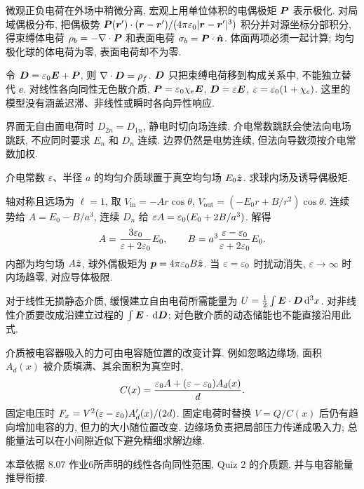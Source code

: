 微观正负电荷在外场中稍微分离, 宏观上用单位体积的电偶极矩 $\boldsymbol{P}$ 表示极化. 对局域偶极分布, 把偶极势 $\boldsymbol{P}(\boldsymbol{r}')\cdot(\boldsymbol{r}-\boldsymbol{r}')/(4\pi\varepsilon_0|\boldsymbol{r}-\boldsymbol{r}'|^3)$ 积分并对源坐标分部积分, 得束缚体电荷 $\rho_b=-\nabla\cdot\boldsymbol{P}$ 和表面电荷 $\sigma_b=\boldsymbol{P}\cdot\hat{\boldsymbol{n}}$. 体面两项必须一起计算; 均匀极化球的体电荷为零, 表面电荷却不为零.

令 $\boldsymbol{D}=\varepsilon_0\boldsymbol{E}+\boldsymbol{P}$, 则 $\nabla\cdot\boldsymbol{D}=\rho_f$. $\boldsymbol{D}$ 只把束缚电荷移到构成关系中, 不能独立替代 $\ee$. 对线性各向同性无色散介质, $\boldsymbol{P}=\varepsilon_0\chi_e\boldsymbol{E}$, $\boldsymbol{D}=\varepsilon\boldsymbol{E}$, $\varepsilon=\varepsilon_0(1+\chi_e)$. 这里的模型没有涵盖迟滞、非线性或瞬时各向异性响应.

界面无自由面电荷时 $D_{2n}=D_{1n}$, 静电时切向场连续. 介电常数跳跃会使法向电场跳跃, 不应同时要求 $E_n$ 和 $D_n$ 连续. 边界仍然是电势连续, 但法向导数须按介电常数加权.

\begin{example}
介电常数 $\varepsilon$、半径 $a$ 的均匀介质球置于真空均匀场 $E_0\hat{\boldsymbol{z}}$. 求球内场及诱导偶极矩.
\end{example}
\begin{solution}
轴对称且远场为 $\ell=1$, 取 $V_\mathrm{in}=-Ar\cos\theta$, $V_\mathrm{out}=(-E_0r+B/r^2)\cos\theta$. 连续势给 $A=E_0-B/a^3$, 连续 $D_n$ 给 $\varepsilon A=\varepsilon_0(E_0+2B/a^3)$. 解得
\[
A=\frac{3\varepsilon_0}{\varepsilon+2\varepsilon_0}E_0,\qquad
B=a^3\frac{\varepsilon-\varepsilon_0}{\varepsilon+2\varepsilon_0}E_0.
\]
内部为均匀场 $A\hat{\boldsymbol{z}}$, 球外偶极矩为 $\boldsymbol{p}=4\pi\varepsilon_0 B\hat{\boldsymbol{z}}$. 当 $\varepsilon=\varepsilon_0$ 时扰动消失, $\varepsilon\to\infty$ 时内场趋零, 对应导体极限.
\end{solution}
对于线性无损静态介质, 缓慢建立自由电荷所需能量为 $U=\frac12\int\boldsymbol{E}\cdot\boldsymbol{D}\,\mathrm d^3x$. 对非线性介质要改成沿建立过程的 $\int\boldsymbol{E}\cdot\,\mathrm d\boldsymbol{D}$; 对色散介质的动态储能也不能直接沿用此式.

介质被电容器吸入的力可由电容随位置的改变计算. 例如忽略边缘场, 面积 $A_d(x)$ 被介质填满、其余面积为真空时,
\[
C(x)=\frac{\varepsilon_0 A+(\varepsilon-\varepsilon_0)A_d(x)}d.
\]
固定电压时 $F_x=V^2(\varepsilon-\varepsilon_0)A_d'(x)/(2d)$. 固定电荷时替换 $V=Q/C(x)$ 后仍有趋向增加电容的力, 但力的大小随位置改变. 边缘场负责把局部压力传递成吸入力; 总能量法可以在小间隙近似下避免精细求解边缘.



本章依据 8.07 作业6所声明的线性各向同性范围, Quiz 2 的介质题, 并与电容能量推导衔接.
